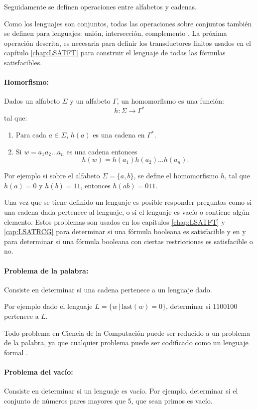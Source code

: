 \documentclass[12pt]{article}
\begin{document}
Seguidamente se definen operaciones entre alfabetos y cadenas.

Como los lenguajes son conjuntos, todas las operaciones sobre conjuntos también se definen para lenguajes: unión, intersección, complemento \cite{authomataTheory}.
La próxima operación descrita, es necesaria para definir los transductores finitos usados en el capítulo \ref{chap:LSATFT} para 
construir el lenguaje de todas las fórmulas satisfacibles.

\paragraph{Homorfismo:} Dados un alfabeto \( \Sigma \) y un alfabeto \( \Gamma \), un homomorfismo es una función:
\[
  h: \Sigma \to \Gamma^*
\]
tal que:
\begin{enumerate}
  \item Para cada \( a \in \Sigma \), \( h(a) \) es una cadena en \( \Gamma^* \).
  \item Si $w=a_1a_2\ldots a_n$ es una cadena entonces
        $$h(w)=h(a_1)h(a_2)\ldots h(a_n).$$
\end{enumerate}

Por ejemplo si sobre el alfabeto $\Sigma=\{a,b\}$, se define el homomorfismo $h$, tal que $h(a)=0$ y $h(b)=11$, entonces
$h(ab)=011$.


Una vez que se tiene definido un lenguaje es posible responder preguntas como si una cadena dada pertenece al lenguaje, o si el lenguaje es vacío o contiene algún elemento.
Estos problemas son usados en los capítulos \ref{chap:LSATFT} y \ref{cap:LSATRCG} para determinar si una fórmula booleana
es satisfacible y en \cite{aCFSAT} y \cite{aSRCSAT} para determinar si una fórmula booleana con ciertas restricciones es 
satisfacible o no.

\paragraph{Problema de la palabra:} Consiste en determinar si una cadena pertenece a un lenguaje dado.

Por ejemplo dado el lenguaje $L=\{w\,|\,\text{last}(w)=0\}$, determinar si $1100100$ pertenece a $L$.

Todo problema en Ciencia de la Computación puede ser reducido a un problema de la palabra, ya que cualquier problema puede ser codificado como un lenguaje formal \cite{authomataTheory}.

\paragraph{Problema del vacío:} Consiste en determinar si un lenguaje es vacío. 
Por ejemplo, determinar si el conjunto de números pares mayores que 5, que sean primos es vacío.
\end{document}
